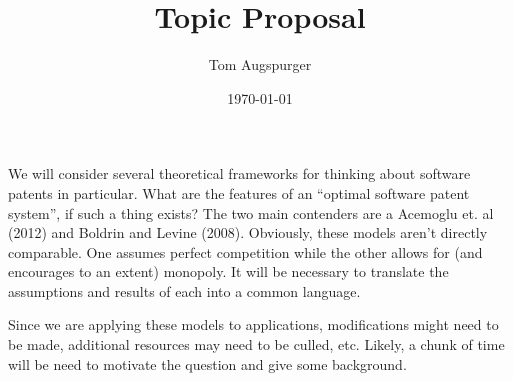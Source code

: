 \documentclass[11pt]{article}
\title{Topic Proposal}
\author{Tom Augspurger}
\date{\today}
\begin{document}
\maketitle

We will consider several theoretical frameworks for thinking about software patents in particular.  What are the features of an ``optimal software patent system'', if such a thing exists? The two main contenders are a Acemoglu et. al (2012) and Boldrin and Levine (2008).  Obviously, these models aren't directly comparable.  One assumes perfect competition while the other allows for (and encourages to an extent) monopoly. It will be necessary to translate the assumptions and results of each into a common language.  

Since we are applying these models to applications, modifications might need to be made, additional resources may need to be culled, etc.  Likely, a chunk of time will be need to motivate the question and give some background.
\end{document}
